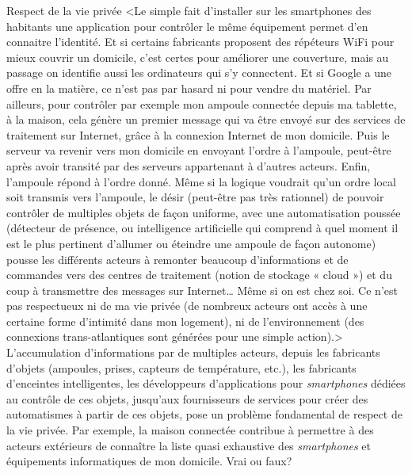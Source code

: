 \begin{quiz}[title={Informatique embarquée et objets connectés}]
\begin{quizquestion*}[t]{2}{1}{Respect de la vie privée}
<Le simple fait d’installer sur les smartphones des habitants une application pour contrôler le même équipement permet d’en connaitre l’identité.
Et si certains fabricants proposent des répéteurs WiFi pour mieux couvrir un domicile, c’est certes pour améliorer une couverture, mais au passage on identifie aussi les ordinateurs qui s'y connectent. Et si Google a une offre en la matière, ce n’est pas par hasard ni pour vendre du matériel.
Par ailleurs, pour contrôler par exemple mon ampoule connectée depuis ma tablette, à la maison, cela génère un premier message qui va être envoyé sur des services de traitement sur Internet, grâce à la connexion Internet de mon domicile. Puis le serveur va revenir vers mon domicile en envoyant l’ordre à l'ampoule, peut-être après avoir transité par des serveurs appartenant à d’autres acteurs. Enfin, l’ampoule répond à l'ordre donné. Même si la logique voudrait qu’un ordre local soit transmis vers l’ampoule, le désir (peut-être pas très rationnel) de pouvoir contrôler de multiples objets de façon uniforme, avec une automatisation poussée (détecteur de présence, ou intelligence artificielle qui comprend à quel moment il est le plus pertinent d’allumer ou éteindre une ampoule de façon autonome) pousse les différents acteurs à remonter beaucoup d’informations et de commandes vers des centres de traitement (notion de stockage « cloud ») et du coup à transmettre des messages sur Internet… Même si on est chez soi.
Ce n’est pas respectueux ni de ma vie privée (de nombreux acteurs ont accès à une certaine forme d’intimité dans mon logement), ni de l’environnement (des connexions trans-atlantiques sont générées pour une simple action).>
L’accumulation d’informations par de multiples acteurs, depuis les fabricants d’objets (ampoules, prises, capteurs de température, etc.), les fabricants d’enceintes intelligentes, les développeurs d’applications pour \textit{smartphones} dédiées au contrôle de ces objets, jusqu'aux fournisseurs de services pour créer des automatismes à partir de ces objets, pose un problème fondamental de respect de la vie privée.
Par exemple, la maison connectée contribue à permettre à des acteurs extérieurs de connaître la liste quasi exhaustive des \textit{smartphones} et équipements informatiques de mon domicile.
Vrai ou faux? 
\end{quizquestion*}
\end{quiz}

